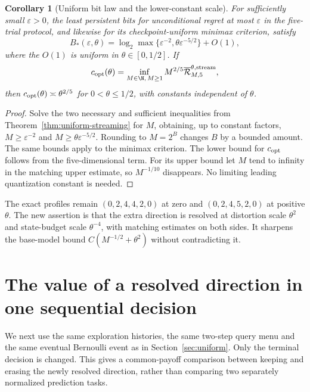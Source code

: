 \documentclass[11pt]{amsart}
\newtheorem{corollary}[theorem]{Corollary}
\theoremstyle{definition}\newtheorem{definition}[theorem]{Definition}
\theoremstyle{remark}\newtheorem{remark}[theorem]{Remark}
\begin{document}
\begin{corollary}[Uniform bit law and the lower-constant scale]\label{cor:uniform-bits}
For sufficiently small $\varepsilon>0$, the least persistent bits for
unconditional regret at most $\varepsilon$ in the five-trial protocol,
and likewise for its checkpoint-uniform minimax criterion, satisfy
\begin{equation}\label{eq:uniform-bits}
 B_*(\varepsilon,\theta)
   =\log_2\max\{\varepsilon^{-2},\theta\varepsilon^{-5/2}\}+O(1),
\end{equation}
where the $O(1)$ is uniform in $\theta\in[0,1/2]$. If
\[
 c_{\rm opt}(\theta)=\inf_{M\in\N,\,M\ge1}
           M^{2/5}\overline{\mathcal R}_{M,5}^{\theta,\mathrm{stream}},
\]
then $c_{\rm opt}(\theta)\asymp\theta^{2/5}$ for $0<\theta\le1/2$,
with constants independent of $\theta$.
\end{corollary}
\begin{proof}
Solve the two necessary and sufficient inequalities from
Theorem~\ref{thm:uniform-streaming} for $M$, obtaining, up to constant
factors, $M\ge\varepsilon^{-2}$ and $M\ge\theta\varepsilon^{-5/2}$.
Rounding to $M=2^B$ changes $B$ by a bounded amount. The same bounds
apply to the minimax criterion. The lower bound for $c_{\rm opt}$ follows
from the five-dimensional term. For its upper bound let $M$ tend to
infinity in the matching upper estimate, so
$M^{-1/10}$ disappears. No limiting leading quantization constant is
needed.
\end{proof}

The exact profiles remain $(0,2,4,4,2,0)$ at zero and
$(0,2,4,5,2,0)$ at positive $\theta$. The new assertion is that the extra
direction is resolved at distortion scale $\theta^2$ and state-budget
scale $\theta^{-4}$, with matching estimates on both sides. It sharpens
the base-model bound $C(M^{-1/2}+\theta^2)$ without contradicting it.

\section{The value of a resolved direction in one sequential decision}\label{sec:resolved-value}
We next use the same exploration histories, the same two-step query menu
and the same eventual Bernoulli event as in Section~\ref{sec:uniform}.
Only the terminal decision is changed. This gives a common-payoff
comparison between keeping and erasing the newly resolved direction,
rather than comparing two separately normalized prediction tasks.
\end{document}
